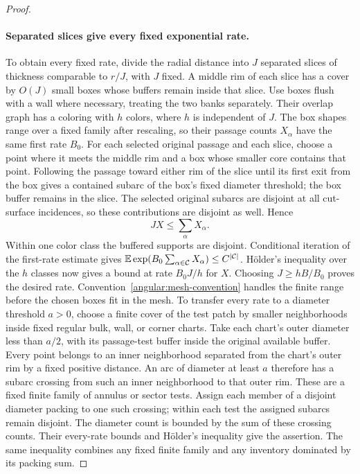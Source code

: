 \begin{proof}
\paragraph{Separated slices give every fixed exponential rate.}
To obtain every fixed rate, divide the radial distance into \(J\)
separated slices of thickness comparable to \(r/J\), with \(J\)
fixed.  A middle rim of each slice has a cover by \(O(J)\) small
boxes whose buffers remain inside that slice.  Use boxes flush
with a wall where necessary, treating the two banks separately.
Their overlap graph has a coloring with \(h\) colors, where \(h\)
is independent of \(J\).  The box shapes range over a fixed family
after rescaling, so their passage counts \(X_\alpha\) have the same
first rate \(B_0\).  For each selected original passage and each slice,
choose a point where it meets the middle rim and a box whose smaller core
contains that point.  Following the passage toward either rim of the slice
until its first exit from the box gives a contained subarc of the box's
fixed diameter threshold;
the box buffer remains in the slice.  The selected original subarcs are
disjoint at all cut-surface incidences, so these contributions are
disjoint as well.  Hence
\[
 JX\le\sum_\alpha X_\alpha .
\]
Within one color class the buffered supports are disjoint.
Conditional iteration of the first-rate estimate gives
\(\mathbb E\exp(B_0\sum_{\alpha\in\mathcal C}X_\alpha)
\le C^{|\mathcal C|}\).
H\"older's inequality over the \(h\) classes now gives a bound at
rate \(B_0J/h\) for \(X\).  Choosing \(J\ge hB/B_0\) proves the
desired rate.  Convention~\ref{angular:mesh-convention} handles
the finite range before the chosen boxes fit in the mesh.
To transfer every rate to a diameter threshold $a>0$, choose a finite
cover of the test patch by smaller neighborhoods inside fixed regular
bulk, wall, or corner charts. Take each chart's outer diameter less
than $a/2$, with its passage-test buffer inside the original available
buffer. Every point belongs to an inner neighborhood separated from
the chart's outer rim by a fixed positive distance. An arc of diameter
at least $a$ therefore has a subarc crossing from such an inner
neighborhood to that outer rim. These are a fixed finite family of
annulus or sector tests. Assign each member of a disjoint diameter
packing to one such crossing; within each test the assigned subarcs
remain disjoint. The diameter count is bounded by the sum of these
crossing counts. Their every-rate bounds and H\"older's inequality
give the assertion. The same inequality combines any fixed finite
family and any inventory dominated by its packing sum.
\end{proof}

